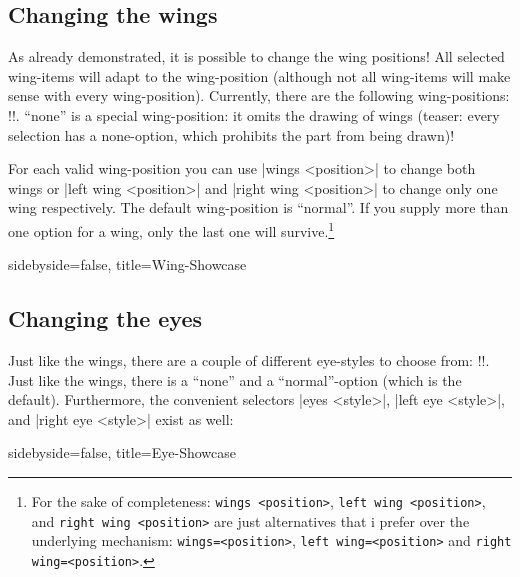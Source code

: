 \documentclass[parskip=half,english,noenddot,numbers=noenddot,footnotes=nomultiple,oneside]{scrartcl}
\makeatletter
\let\say\enquote
\def\DTLlistformatitem#1{\textit{#1}}
\newcommand*\typesetselection[1][]{\begingroup\ifx!#1!\else\def\DTLlistformatitem##1{#1}\fi\dotypesetselection}
\def\dotypesetselection#1{\expandafter\DTLformatlist\expandafter{\csname @pingu@#1@\endcsname}\endgroup}
\def\ipingu#1{\lstinline'#1'}
\makeatother
\begin{document}
\subsection{Changing the wings}
\label{subsec:wings}As already demonstrated, it is possible to change the wing positions!
All selected wing-items will adapt to the wing-position (although not all wing-items will make sense with every wing-position).
Currently, there are the following wing-positions:
\typesetselection{leftwing}. \say{none} is a special wing-position: it omits the drawing of wings (teaser: every selection has a none-option, which prohibits the part from being drawn)!

For each valid wing-position you can use |wings <position>| to change both wings or |left wing <position>| and |right wing <position>| to change only one wing respectively. The default wing-position is \say{normal}. If you supply more than one option for a wing, only the last one will survive.\footnote{For the sake of completeness: \ipingu{wings <position>}, \ipingu{left wing <position>}, and \ipingu{right wing <position>} are just alternatives that i prefer over the underlying mechanism: \ipingu{wings=<position>}, \ipingu{left wing=<position>} and \ipingu{right wing=<position>}.}
\begin{tcblisting}{sidebyside=false, title=Wing-Showcase}
\begin{tikzpicture}
	\pingu[left wing none, heart=green]
	\pingu[wings wave, heart=teal,    xshift=3.5cm]
	\pingu[wings hug,  heart=orange,  xshift=7cm]
	\pingu[left wing grab, right wing shock, heart=purple,  xshift=10.5cm]
\end{tikzpicture}
\end{tcblisting}

\subsection{Changing the eyes}
Just like the wings, there are a couple of different eye-styles to choose from: \typesetselection{lefteye}. Just like the wings, there is a \say{none} and a \say{normal}-option (which is the default).
Furthermore, the convenient selectors |eyes <style>|, |left eye <style>|, and |right eye <style>| exist as well:
\begin{tcblisting}{sidebyside=false, title=Eye-Showcase}
\begin{tikzpicture}
	\pingu[left eye none, heart=green]
	\pingu[eyes wink, heart=teal, xshift=3.5cm]
	\pingu[eyes shock,  heart=orange, xshift=7cm]
	\pingu[left eye devil, right eye angry, heart=purple,  xshift=10.5cm]
\end{tikzpicture}
\end{tcblisting}
\end{document}
